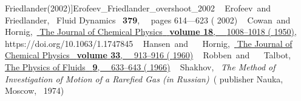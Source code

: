 \documentclass[letterpaper,11pt,oneside,reqno]{amsart}
\numberwithin{equation}{section}
\theoremstyle{definition}
\theoremstyle{qqq}
\begin{document}
\begin{thebibliography}{41}
{		{Friedlander}(2002)}]{Erofeev_Friedlander_overshoot_2002}%
	\BibitemOpen
	 { {\ \bibnamefont
			{Erofeev}}\ and\  {\ \bibnamefont
			{Friedlander}},\ }\href@noop {} { {
			{Fluid Dynamics}\ }\textbf { {379}},\ \unskip\ \bibinfo
		{pages} {614--–623} ( {2002})}%
	\BibitemOpen
	 { {\ \bibnamefont
			{Cowan}}\ and\  {\ \bibnamefont
			{Hornig}},\ }\href {\doibase 10.1063/1.1747845} {
		{ {The Journal of Chemical Physics}\ }\textbf {\bibinfo
			{volume} {18}},\ \unskip\  {1008--1018} (
		{1950})},\ 
	{https://doi.org/10.1063/1.1747845} %
	\BibitemOpen
	 { {~\bibnamefont
			{Hansen}}\ and\  {\ \bibnamefont
			{Hornig}},\ }\href {\doibase 10.1063/1.1731288} {
		{ {The Journal of Chemical Physics}\ }\textbf {\bibinfo
			{volume} {33}},\ \unskip\  {913--916} (
		{1960})}%
	\BibitemOpen
	 { {~\bibnamefont
			{Robben}}\ and\  {~\bibnamefont
			{Talbot}},\ }\href {\doibase 10.1063/1.1761728} {
		{ {The Physics of Fluids}\ }\textbf {
			{9}},\ \unskip\  {633--643} (
		{1966})}%
	\BibitemOpen
	 { {~\bibnamefont
			{Shakhov}},\ }\href@noop {} {\emph { {The Method of
				Investigation of Motion of a Rarefied Gas (in Russian)}}}\ (\bibinfo
	{publisher} {Nauka},\  {Moscow},\ 
	{1974})%
	\BibitemOpen
	 { {\ \bibnamefont
}}
\end{thebibliography}
\end{document}
